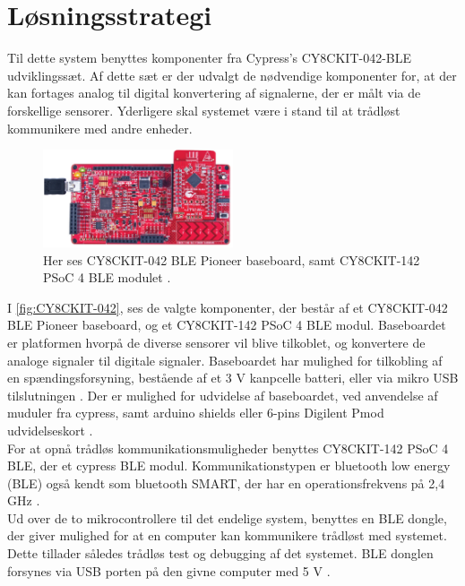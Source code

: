\section{Løsningsstrategi}
Til dette system benyttes komponenter fra Cypress's CY8CKIT-042-BLE udviklingssæt. 
Af dette sæt er der udvalgt de nødvendige komponenter for, at der kan fortages analog til digital konvertering af signalerne, der er målt via de forskellige sensorer. Yderligere skal systemet være i stand til at trådløst kommunikere med andre enheder.   

\begin{figure}[H]
\centering
\includegraphics[width=0.5\textwidth]{figures/CY8CKIT-042.png}
\caption{Her ses CY8CKIT-042 BLE Pioneer baseboard, samt CY8CKIT-142 PSoC 4 BLE modulet \citep{cypresspsoc2015}.}
\label{fig:CY8CKIT-042}
\end{figure}

I \autoref{fig:CY8CKIT-042}, ses de valgte komponenter, der består af et CY8CKIT-042 BLE Pioneer baseboard, og et CY8CKIT-142 PSoC 4 BLE modul. Baseboardet er platformen hvorpå de diverse sensorer vil blive tilkoblet, og konvertere de analoge signaler til digitale signaler. Baseboardet har mulighed for tilkobling af en spændingsforsyning, bestående af et 3 V kanpcelle batteri, eller via mikro USB tilslutningen \citep{cypressguide2014}. Der er mulighed for udvidelse af baseboardet, ved anvendelse af muduler fra cypress, samt arduino shields eller 6-pins Digilent Pmod udvidelseskort \citep{cypressguide2014}. 
\\

For at opnå trådløs kommunikationsmuligheder benyttes CY8CKIT-142 PSoC 4 BLE, der et cypress BLE modul. Kommunikationstypen er bluetooth low energy (BLE) også kendt som bluetooth SMART, der har en operationsfrekvens på 2,4 GHz \citep{cypressguide}. 
\\

Ud over de to mikrocontrollere til det endelige system, benyttes en BLE dongle, der giver mulighed for at en computer kan kommunikere trådløst med systemet. Dette tillader således trådløs test og debugging af det systemet. BLE donglen forsynes via USB porten på den givne computer med 5 V \citep{cypressguide2014}. 
\\

